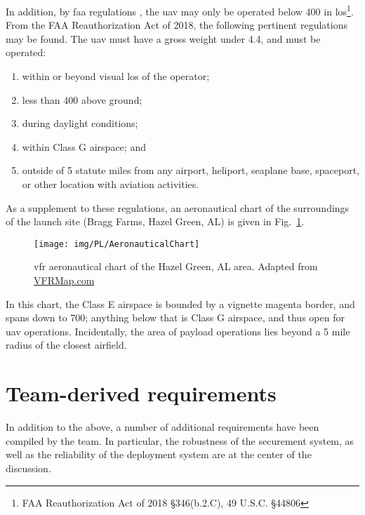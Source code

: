 In addition, by \gls{faa} regulations \citep{FederalAviationAdministration2018}, the \gls{uav} may only be operated below \SI{400}{\feet} in \gls{los}\footnote{FAA Reauthorization Act of 2018 \S 346(b.2.C), 49 U.S.C. \S 44806}. From the FAA Reauthorization Act of 2018, the following pertinent regulations may be found. The \gls{uav} must have a gross weight under \SI{4.4}{\poundm}, and must be operated:

\begin{enumerate}[noitemsep, label=(\roman*)]
	\item within or beyond visual \gls{los} of the operator;
	\item less than \SI{400}{\feet} above ground;
	\item during daylight conditions;
	\item within Class G airspace; and
	\item outside of 5 statute miles from any airport, heliport, seaplane base, spaceport, or other location with aviation activities.
\end{enumerate}

As a supplement to these regulations, an aeronautical chart of the surroundings of the launch site (Bragg Farms, Hazel Green, AL) is given in Fig.~\ref{fig:PL:Deployment:VFRchart}.

\begin{figure}[H]
	\centering
	\texttt{[image: img/PL/AeronauticalChart]}
	\caption[VFR aeronautical chart of the Hazel Green, AL area]{\gls{vfr} aeronautical chart of the Hazel Green, AL area. Adapted from \href{http://vfrmap.com/}{VFRMap.com}}
	\label{fig:PL:Deployment:VFRchart}
\end{figure}

In this chart, the Class E airspace is bounded by a vignette magenta border, and spans down to \SI{700}{\feet}; anything below that is Class G airspace, and thus open for \gls{uav} operations. Incidentally, the area of payload operations lies beyond a 5 mile radius of the closest airfield.

\section{Team-derived requirements}

In addition to the above, a number of additional requirements have been compiled by the team. In particular, the robustness of the securement system, as well as the reliability of the deployment system are at the center of the discussion.

